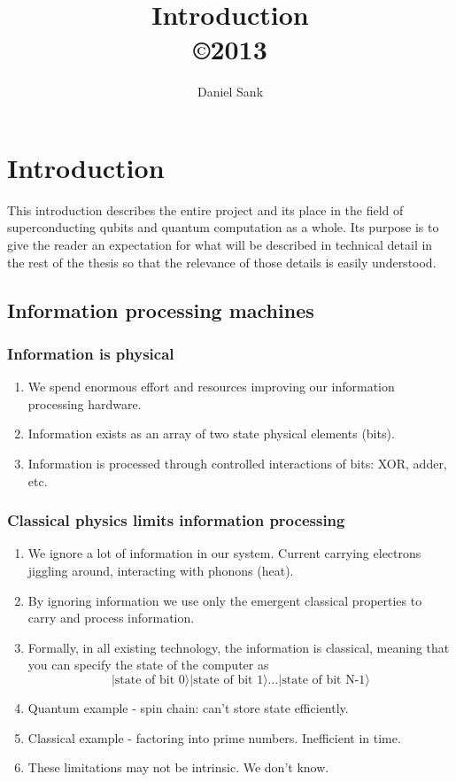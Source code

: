 \documentclass{report}
\author{Daniel Sank}
\title{Introduction \\
\copyright 2013}
\providecommand{\ket}[1]{|#1\rangle}
\begin{document}

\chapter{Introduction}
This introduction describes the entire project and its place in the field of superconducting qubits and quantum computation as a whole. Its purpose is to give the reader an expectation for what will be described in technical detail in the rest of the thesis so that the relevance of those details is easily understood.

\section{Information processing machines}

\subsection{Information is physical}
\begin{enumerate}
\item We spend enormous effort and resources improving our information processing hardware.
\item Information exists as an array of two state physical elements (bits).
\item Information is processed through controlled interactions of bits: XOR, adder, etc.
\end{enumerate}

\subsection{Classical physics limits information processing}
\begin{enumerate}
\item We ignore a lot of information in our system. Current carrying electrons jiggling around, interacting with phonons (heat).
\item By ignoring information we use only the emergent classical properties to carry and process information.
\item Formally, in all existing technology, the information is classical, meaning that you can specify the state of the computer as \begin{displaymath}
\ket{\textrm{state of bit 0}} \ket{\textrm{state of bit 1}} \ldots \ket{\textrm{state of bit N-1}} \end{displaymath}
\item Quantum example - spin chain: can't store state efficiently.
\item Classical example - factoring into prime numbers. Inefficient in time.
\item These limitations may not be intrinsic. We don't know.
\end{enumerate} 
\end{document}
